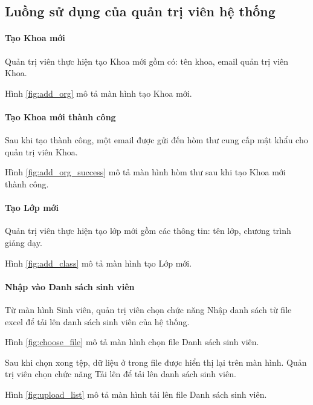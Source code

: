\documentclass[./../main.tex]{subfiles}
\begin{document}
\subsection{Luồng sử dụng của quản trị viên hệ thống}

\paragraph*{Tạo Khoa mới}

Quản trị viên thực hiện tạo Khoa mới gồm có: tên khoa, email quản trị viên Khoa.

Hình \ref{fig:add_org} mô tả màn hình tạo Khoa mới.

\paragraph*{Tạo Khoa mới thành công}

Sau khi tạo thành công, một email được gửi đến hòm thư cung cấp mật khẩu cho quản trị viên Khoa.

Hình \ref{fig:add_org_success} mô tả màn hình hòm thư sau khi tạo Khoa mới thành công.

\paragraph*{Tạo Lớp mới}

Quản trị viên thực hiện tạo lớp mới gồm các thông tin: tên lớp, chương trình giảng dạy.

Hình \ref{fig:add_class} mô tả màn hình tạo Lớp mới.

\paragraph*{Nhập vào Danh sách sinh viên}

Từ màn hình Sinh viên, quản trị viên chọn chức năng Nhập danh sách từ file excel để tải lên danh sách sinh viên của hệ thống.

Hình \ref{fig:choose_file} mô tả màn hình chọn file Danh sách sinh viên.

Sau khi chọn xong tệp, dữ liệu ở trong file được hiển thị lại trên màn hình. Quản trị viên chọn chức năng Tải lên để tải lên danh sách sinh viên.

Hình \ref{fig:upload_list} mô tả màn hình tải lên file Danh sách sinh viên.
\end{document}
